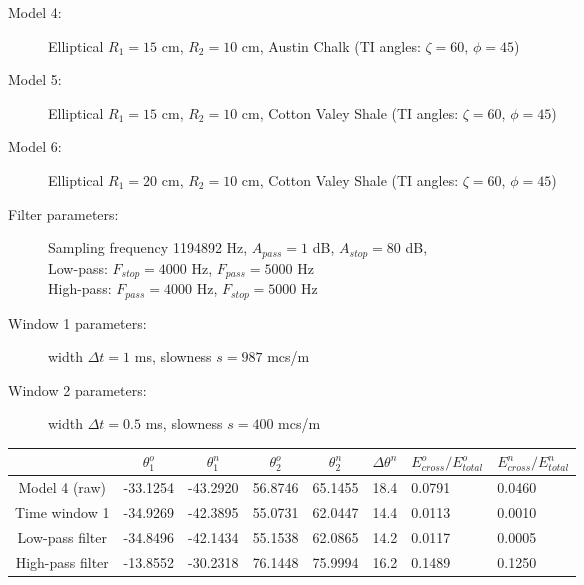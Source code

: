 \documentclass[a4paper,11pt]{article}
\begin{document}
\begin{description}
\item[Model 4:] Elliptical $R_1=15$ cm, $R_2=10$ cm, Austin Chalk (TI angles: $\zeta=60$\textdegree, $\phi=45$\textdegree) 
\item[Model 5:] Elliptical $R_1=15$ cm, $R_2=10$ cm, Cotton Valey Shale (TI angles: $\zeta=60$\textdegree, $\phi=45$\textdegree) 
\item[Model 6:] Elliptical $R_1=20$ cm, $R_2=10$ cm, Cotton Valey Shale (TI angles: $\zeta=60$\textdegree, $\phi=45$\textdegree) 
\end{description}

\begin{description}
\item[Filter parameters:] Sampling frequency 1194892 Hz, $A_{pass} = 1$ dB, $A_{stop} = 80$ dB, \\ Low-pass: $F_{stop} = 4000$ Hz, $F_{pass} = 5000$ Hz \\ High-pass: $F_{pass} = 4000$ Hz, $F_{stop} = 5000$ Hz
\item[Window 1 parameters:] width $\Delta t=1$ ms, slowness $s = 987$ mcs/m
\item[Window 2 parameters:] width $\Delta t=0.5$ ms, slowness $s = 400$ mcs/m
\end{description}

\renewcommand{\arraystretch}{1.5}
\footnotesize
\begin{tabular}{c|rr|rr|r|ll}
				&\multicolumn{1}{c}{$\theta_1^o$} & \multicolumn{1}{c|}{$\theta_1^n$} & \multicolumn{1}{c}{$\theta_2^o$} & \multicolumn{1}{c|}{$\theta_2^n$} & \multicolumn{1}{c|}{$\Delta\theta^n$}& \multicolumn{1}{c}{$E_{cross}^o/E_{total}^o$} & \multicolumn{1}{c}{$E_{cross}^n/E_{total}^n$} \\ \hline
\hline  Model 4 (raw) & -33.1254 & -43.2920 & 56.8746 & 65.1455 & 18.4 & 0.0791 & 0.0460 \\
		Time window 1 & -34.9269 & -42.3895 & 55.0731 & 62.0447 & 14.4 & 0.0113 & 0.0010 \\
	   Low-pass filter & -34.8496 & -42.1434 & 55.1538 & 62.0865 & 14.2 & 0.0117 & 0.0005 \\
 	   High-pass filter & -13.8552 & -30.2318 & 76.1448 & 75.9994 & 16.2 & 0.1489 & 0.1250 \\ 	   
 	    \hline 
\end{tabular} 
\normalsize
\renewcommand{\arraystretch}{1.0}

\vspace{\baselineskip}
\end{document}
